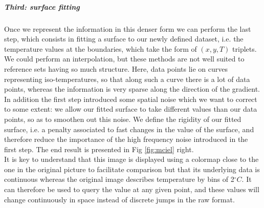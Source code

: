 \subparagraph{Third: surface fitting} Once we represent the information in this denser form we can perform the last step, which consists in fitting a surface to our newly defined dataset, i.e. the temperature values at the boundaries, which take the form of $(x,y,T)$ triplets. We could perform an interpolation, but these methods are not well suited to reference sets having so much structure. Here, data points lie on curves representing iso-temperatures, so that along such a curve there is a lot of data points, whereas the information is very sparse along the direction of the gradient. In addition the first step introduced some spatial noise which we want to correct to some extent: we allow our fitted surface to take different values than our data points, so as to smoothen out this noise. We define the rigidity of our fitted surface, i.e. a penalty associated to fast changes in the value of the surface, and therefore reduce the importance of the high frequency noise introduced in the first step. The end result is presented in Fig \ref{fig:mciel} right. \\

It is key to understand that this image is displayed using a colormap close to the one in the original picture to facilitate comparison but that its underlying data is continuous whereas the original image describes temperature by bins of 2$^{\circ}C$. It can therefore be used to query the value at any given point, and these values will change continuously in space instead of discrete jumps in the raw format.\\


